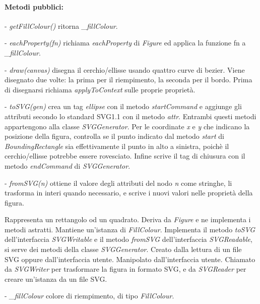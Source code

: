 \paragraph{Metodi pubblici:}
\begin{elencopuntato}[\subsubsecindent]
\item[-] \textit{getFillColour()} ritorna \textit{{\_}fillColour}.
\item[-] \textit{eachProperty(fn)} richiama \textit{eachProperty} di \textit{Figure} ed applica la funzione fn a \textit{{\_}fillColour}.
\item[-] \textit{draw(canvas)} disegna il cerchio/ellisse usando quattro curve di bezier. Viene disegnato due volte: la prima per il riempimento, la seconda per il bordo. Prima di disegnarsi richiama \textit{applyToContext} sulle proprie propriet\`a.
\item[-] \textit{toSVG(gen)} crea un tag \textit{ellipse} con il metodo \textit{startCommand} e aggiunge gli attributi secondo lo standard SVG1.1 con il metodo \textit{attr}. Entrambi questi metodi appartengono alla classe \textit{SVGGenerator}. Per le coordinate \textit{x} e \textit{y} che indicano la posizione della figura, controlla se il punto indicato dal metodo \textit{start} di \textit{BoundingRectangle} sia effettivamente il punto in alto a sinistra, poich\`e il cerchio/ellisse potrebbe essere rovesciato. Infine scrive il tag di chiusura con il metodo \textit{endCommand} di \textit{SVGGenerator}.
\item[-] \textit{fromSVG(n)} ottiene il valore degli attributi del nodo \textit{n} come stringhe, li trasforma in interi quando necessario, e scrive i nuovi valori nelle propriet\`a della figura. 
\end{elencopuntato}

Rappresenta un rettangolo od un quadrato.
Deriva da \textit{Figure} e ne implementa i metodi astratti. Mantiene un'istanza di \textit{FillColour}. Implementa il metodo \textit{toSVG} dell'interfaccia \textit{SVGWritable} e il metodo \textit{fromSVG} dell'interfaccia \textit{SVGReadable}, si serve dei metodi della classe \textit{SVGGenerator}.
Creato dalla lettura di un file SVG oppure dall'interfaccia utente. Manipolato dall'interfaccia utente. Chiamato da \textit{SVGWriter} per trasformare la figura in formato SVG, e da \textit{SVGReader} per creare un'istanza da un file SVG.
\begin{elencopuntato}[\subsubsecindent]
\item[-] \textit{{\_}fillColour} colore di riempimento, di tipo \textit{FillColour}.
\end{elencopuntato}
